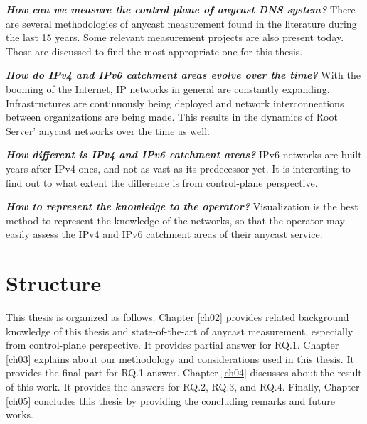 \begin{description}
	\setlength{\itemsep}{1pt}
	\setlength{\parskip}{0pt}
	\item [\textbf{RQ.1}] \textit{\textbf{How can we measure the control plane of anycast DNS system?}} There are several methodologies of anycast measurement found in the literature during the last 15 years. Some relevant measurement projects are also present today. Those are discussed to find the most appropriate one for this thesis.
	\item [\textbf{RQ.2}] \textbf{\textit{How do IPv4 and IPv6 catchment areas evolve over the time?}} With the booming of the Internet, IP networks in general are constantly expanding. Infrastructures are continuously being deployed and network interconnections between organizations are being made. This results in the dynamics of Root Server' anycast networks over the time as well. 
	\item [\textbf{RQ.3}] \textbf{\textit{How different is IPv4 and IPv6 catchment areas?}} IPv6 networks are built years after IPv4 ones, and not as vast as its predecessor yet. It is interesting to find out to what extent the difference is from control-plane perspective.
	\item [\textbf{RQ.4}] \textbf{\textit{How to represent the knowledge to the operator?}} Visualization is the best method to represent the knowledge of the networks, so that the operator may  easily assess the IPv4 and IPv6 catchment areas of their anycast service.
\end{description}

\section{Structure}
\label{ch01:structure}
This thesis is organized as follows. Chapter \ref{ch02} provides related background knowledge of this thesis and state-of-the-art of anycast measurement, especially from control-plane perspective. It provides partial answer for RQ.1. Chapter \ref{ch03} explains about our methodology and considerations used in this thesis. It provides the final part for RQ.1 answer. Chapter \ref{ch04} discusses about the result of this work. It provides the answers for RQ.2, RQ.3, and RQ.4. Finally, Chapter \ref{ch05} concludes this thesis by providing the concluding remarks and future works.